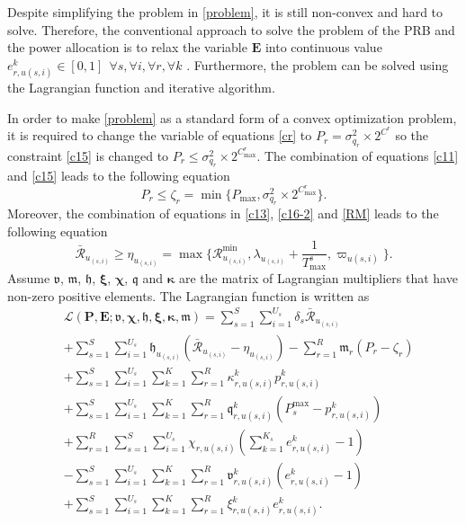 \documentclass[lettersize,journal]{IEEEtran}
\begin{document}
Despite simplifying the problem in \eqref{problem}, it is still non-convex and hard to solve.
Therefore, the conventional approach to solve the problem of the PRB and the power allocation is to relax the variable $\mathbf{E}$ into continuous value $e_{r,u(s,i)}^k \in [0,1] \:\: \forall s , \forall i ,\forall r, \forall k$ \cite{lee2018dynamic,ali2018joint}.
Furthermore, the problem can be solved using the Lagrangian function and iterative algorithm.

In order to make \eqref{problem} as a standard form of a convex optimization problem, it is required to change the variable of equations \eqref{cr} to $P_r = \sigma_{q_r}^2\times 2^{C^r}$ so the constraint
\eqref{c15} is changed to
 $P_r \leq \sigma_{q_r}^2\times 2^{C^r_{\max}}$.
The combination of equations \eqref{c11} and \eqref{c15} leads to the following equation
\begin{equation} \label{pr11}
P_r\leq \zeta_r= \min\{P_{\max}, \sigma_{q_r}^2\times 2^{C^r_{\max}} \}. 
\end{equation}
Moreover, the combination of equations in \eqref{c13}, \eqref{c16-2} and \eqref{RM} leads to the following equation
\begin{equation}\label{RConstr}
\mathcal{\bar{R}}_{u_{(s,i)}} \geq\eta_{u_{(s,i)}}= \max\{\mathcal{R}_{u_{(s,i)}}^{\min}, \lambda_{u_{(s,i)}}+\frac{1}{T^s_{\max}}, \varpi_{u(s,i)} \}. 
\end{equation}
Assume $\boldsymbol{\mathfrak{v}}$, $\boldsymbol{\mathfrak{m}}$, $\boldsymbol{\mathfrak{h}}$, $\boldsymbol{\xi}$, $\boldsymbol{\chi}$, $\boldsymbol{\mathfrak{q}}$ and $\boldsymbol{ \kappa}$ are the matrix of Lagrangian multipliers that have non-zero positive elements. The Lagrangian function is written as
\begin{align}\label{lagrang}
&\mathcal{L}(\boldsymbol{P},\boldsymbol{E}; \boldsymbol{\mathfrak{v}}, \boldsymbol{\chi}, \boldsymbol{\mathfrak{h}}, \boldsymbol{ \xi}, \boldsymbol{ \kappa}, \boldsymbol{\mathfrak{m}})  = \sum\limits_{s=1}^{S} \sum\limits_{i=1}^{U_s}\delta_s\mathcal{\bar{R}}_{u_{(s,i)}}\nonumber\\
&+\sum\limits_{s=1}^{S} \sum\limits_{i=1}^{U_s}\mathfrak{h}_{u_{(s,i)}} (\mathcal{\bar{R}}_{u_{(s,i)}}-\eta_{u_{(s,i)}})-  \sum\limits_{r=1}^{R} \mathfrak{m}_{r} (P_{r}- \zeta_r)\nonumber\\
&+  \sum\limits_{s=1}^{S} \sum\limits_{i=1}^{U_s}\sum\limits_{k=1}^{K} \sum\limits_{r=1}^{R}\kappa^k_{r,u(s,i)}  p^k_{r,u(s,i)}\nonumber\\
&+  \sum\limits_{s=1}^{S} \sum\limits_{i=1}^{U_s}\sum\limits_{k=1}^{K} \sum\limits_{r=1}^{R}\mathfrak{q}^k_{r,u(s,i)} (P^{\max}_{s}- p^k_{r,u(s,i)})\nonumber\\
&+ \sum\limits_{r=1}^{R}\sum\limits_{s=1}^{S} \sum\limits_{i=1}^{U_s}\chi_{r,u(s,i)}(\sum_{k =1}^{K_s} e^{k}_{r,u(s,i)} -1)\nonumber\\
&-  \sum\limits_{s=1}^{S} \sum\limits_{i=1}^{U_s}\sum\limits_{k=1}^{K} \sum\limits_{r=1}^{R}\mathfrak{v}^{k}_{r,u(s,i)} (e^{k}_{r,u(s,i)} -1)\nonumber\\
&+  \sum\limits_{s=1}^{S} \sum\limits_{i=1}^{U_s}\sum\limits_{k=1}^{K} \sum\limits_{r=1}^{R} \xi^{k}_{r,u(s,i)} e^{k}_{r,u(s,i)}.
\end{align}
\end{document}
